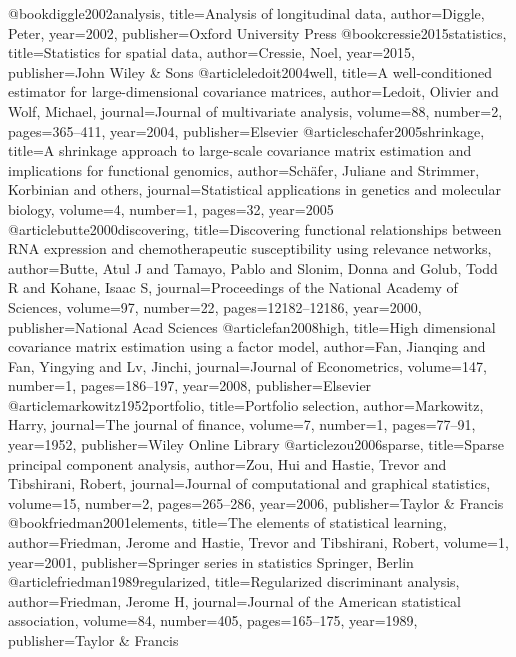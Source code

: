@book{diggle2002analysis,
  title={Analysis of longitudinal data},
  author={Diggle, Peter},
  year={2002},
  publisher={Oxford University Press}
}
@book{cressie2015statistics,
  title={Statistics for spatial data},
  author={Cressie, Noel},
  year={2015},
  publisher={John Wiley \& Sons}
}
@article{ledoit2004well,
  title={A well-conditioned estimator for large-dimensional covariance matrices},
  author={Ledoit, Olivier and Wolf, Michael},
  journal={Journal of multivariate analysis},
  volume={88},
  number={2},
  pages={365--411},
  year={2004},
  publisher={Elsevier}
}
@article{schafer2005shrinkage,
  title={A shrinkage approach to large-scale covariance matrix estimation and implications for functional genomics},
  author={Sch{\"a}fer, Juliane and Strimmer, Korbinian and others},
  journal={Statistical applications in genetics and molecular biology},
  volume={4},
  number={1},
  pages={32},
  year={2005}
}
@article{butte2000discovering,
  title={Discovering functional relationships between RNA expression and chemotherapeutic susceptibility using relevance networks},
  author={Butte, Atul J and Tamayo, Pablo and Slonim, Donna and Golub, Todd R and Kohane, Isaac S},
  journal={Proceedings of the National Academy of Sciences},
  volume={97},
  number={22},
  pages={12182--12186},
  year={2000},
  publisher={National Acad Sciences}
}
@article{fan2008high,
  title={High dimensional covariance matrix estimation using a factor model},
  author={Fan, Jianqing and Fan, Yingying and Lv, Jinchi},
  journal={Journal of Econometrics},
  volume={147},
  number={1},
  pages={186--197},
  year={2008},
  publisher={Elsevier}
}
@article{markowitz1952portfolio,
  title={Portfolio selection},
  author={Markowitz, Harry},
  journal={The journal of finance},
  volume={7},
  number={1},
  pages={77--91},
  year={1952},
  publisher={Wiley Online Library}
}
@article{zou2006sparse,
  title={Sparse principal component analysis},
  author={Zou, Hui and Hastie, Trevor and Tibshirani, Robert},
  journal={Journal of computational and graphical statistics},
  volume={15},
  number={2},
  pages={265--286},
  year={2006},
  publisher={Taylor \& Francis}
}
@book{friedman2001elements,
  title={The elements of statistical learning},
  author={Friedman, Jerome and Hastie, Trevor and Tibshirani, Robert},
  volume={1},
  year={2001},
  publisher={Springer series in statistics Springer, Berlin}
}
@article{friedman1989regularized,
  title={Regularized discriminant analysis},
  author={Friedman, Jerome H},
  journal={Journal of the American statistical association},
  volume={84},
  number={405},
  pages={165--175},
  year={1989},
  publisher={Taylor \& Francis}
}
